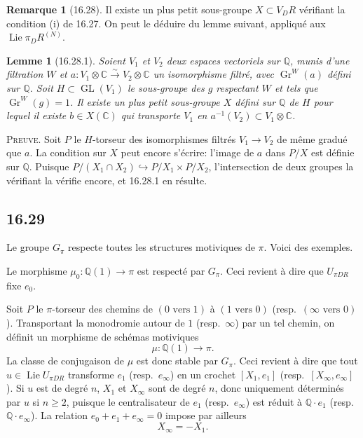 \documentclass[12pt,a4paper]{article}
\theoremstyle{plain}
\newtheorem{lemma}[theorem]{Lemme}
\theoremstyle{definition}
\newtheorem{remark}[theorem]{Remarque}
\theoremstyle{remark}
\DeclareMathOperator{\Lie}{Lie}
\DeclareMathOperator{\GL}{GL}
\DeclareMathOperator{\Gr}{Gr}
\newcommand{\dR}{DR}
\newcommand{\QQ}{\mathbb{Q}}
\newcommand{\CC}{\mathbb{C}}
\begin{document}
\begin{remark}[16.28]
Il existe un plus petit sous-groupe $X \subset V_\dR$ v\'erifiant la
condition (i) de 16.27. On peut le d\'eduire du lemme suivant,
appliqu\'e aux $\Lie \pi_\dR^{(N)}$.

\begin{lemma}[16.28.1]\label{lem:16.28.1}
Soient $V_1$ et $V_2$ deux espaces vectoriels sur $\QQ$, munis d'une
filtration $W$ et $a : V_1 \otimes \CC \xrightarrow{\sim} V_2 \otimes \CC$
un isomorphisme filtr\'e, avec $\Gr^W(a)$ d\'efini sur $\QQ$. Soit
$H \subset \GL(V_1)$ le sous-groupe des $g$ respectant $W$ et tels que
$\Gr^W(g) = 1$. Il existe un plus petit sous-groupe $X$ d\'efini sur
$\QQ$ de $H$ pour lequel il existe $b \in X(\CC)$ qui transporte $V_1$
en $a^{-1}(V_2) \subset V_1 \otimes \CC$.
\end{lemma}

\noindent \textsc{Preuve.} Soit $P$ le $H$-torseur des isomorphismes
filtr\'es $V_1 \to V_2$ de m\^eme gradu\'e que $a$. La condition sur $X$
peut encore s'\'ecrire: l'image de $a$ dans $P/X$ est d\'efinie sur
$\QQ$. Puisque $P/(X_1 \cap X_2) \hookrightarrow P/X_1 \times P/X_2$,
l'intersection de deux groupes la v\'erifiant la v\'erifie encore, et
16.28.1 en r\'esulte.
\end{remark}

\subsection*{16.29}

Le groupe $G_\pi$ respecte toutes les structures motiviques de $\pi$.
Voici des exemples.

Le morphisme $\mu_0 : \QQ(1) \to \pi$ est respect\'e par $G_\pi$. Ceci
revient \`a dire que $U_{\pi\dR}$ fixe $e_0$.

Soit $P$ le $\pi$-torseur des chemins de $(0 \text{ vers } 1)$ \`a
$(1 \text{ vers } 0)$ (resp.\ $(\infty \text{ vers } 0)$). Transportant la
monodromie autour de $1$ (resp.\ $\infty$) par un tel chemin, on
d\'efinit un morphisme de sch\'emas motiviques
\[
\mu : \QQ(1) \to \pi.
\]
La classe de conjugaison de $\mu$ est donc stable par $G_\pi$. Ceci
revient \`a dire que tout $u \in \Lie U_{\pi\dR}$ transforme $e_1$
(resp.\ $e_\infty$) en un crochet $[X_1, e_1]$ (resp.\ $[X_\infty,
e_\infty]$). Si $u$ est de degr\'e $n$, $X_1$ et $X_\infty$ sont de
degr\'e $n$, donc uniquement d\'etermin\'es par $u$ si $n \geq 2$, puisque
le centralisateur de $e_1$ (resp.\ $e_\infty$) est r\'eduit \`a
$\QQ \cdot e_1$ (resp.\ $\QQ \cdot e_\infty$). La relation
$e_0+e_1+e_\infty=0$ impose par ailleurs
\[
X_\infty = -X_1.
\]
\end{document}
